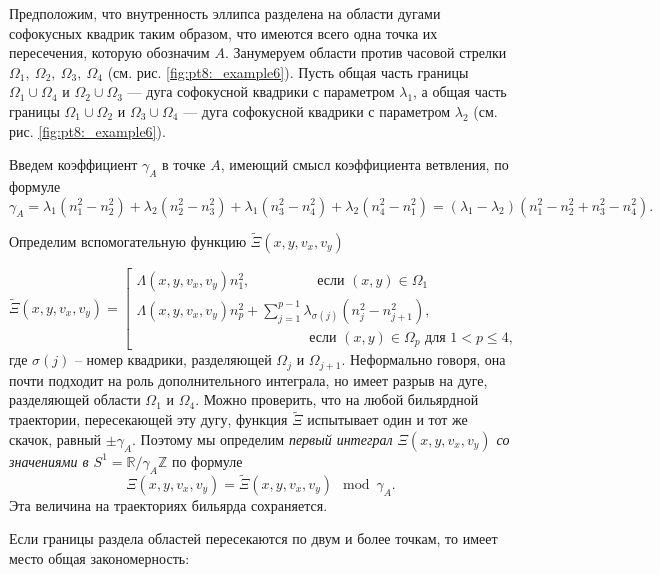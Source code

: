 Предположим, что внутренность эллипса разделена на области дугами софокусных квадрик таким образом, что имеются всего одна точка их пересечения, которую обозначим $A$.
Занумеруем области против часовой стрелки $\Omega_1, \ \Omega_2, \ \Omega_3, \ \Omega_4$ (см. рис. \ref{fig:pt8:_example6}).
Пусть общая часть границы $\Omega_1 \cup \Omega_4$ и $\Omega_2 \cup \Omega_3$ --- дуга софокусной квадрики с параметром $\lambda_1$, а общая часть границы $\Omega_1 \cup \Omega_2$ и $\Omega_3 \cup \Omega_4$ --- дуга софокусной квадрики с параметром $\lambda_2$ (см. рис. \ref{fig:pt8:_example6}).

Введем коэффициент $\gamma_A$ в точке $A$, имеющий смысл коэффициента ветвления, по формуле $$\gamma_A = \lambda_1(n_1^2 - n_2^2) + \lambda_2(n_2^2-n_3^2) + \lambda_1(n_3^2-n_4^2) + \lambda_2(n_4^2-n_1^2) = (\lambda_1 - \lambda_2) ( n_1^2 - n_2^2 + n_3^2 - n_4^2).$$

Определим вспомогательную функцию $\widetilde{\Xi}(x, y, v_x, v_y)$ 

\begin{equation*}
\widetilde{\Xi}(x, y, v_x, v_y) = \left[
\begin{array}{ll}
    \Lambda(x, y, v_x, v_y) n_1^2, \qquad  \  \ \qquad   \text{ если } (x,y) \in \Omega_1 
    \\
    \Lambda(x, y, v_x, v_y) n_p^2 + \sum_{j=1}^{p-1} \lambda_{\sigma(j)}(n_j^2-n_{j+1}^2), \\
     \qquad \qquad \qquad \qquad \qquad \qquad  \text{ если } (x,y) \in \Omega_p \text{ для } 1 < p \leq 4,
\end{array}
\right.
\end{equation*}
где $\sigma(j)$ -- номер квадрики, разделяющей $\Omega_j$ и $\Omega_{j+1}$. 
Неформально говоря, она почти подходит на роль дополнительного интеграла, но имеет разрыв на дуге, разделяющей области $\Omega_1$ и $\Omega_4$. Можно проверить, что на любой бильярдной траектории, пересекающей эту дугу, функция $\widetilde{\Xi}$ испытывает один и тот же скачок, равный  $\pm \gamma_A$. 
Поэтому мы определим \textit{первый интеграл $\Xi(x, y, v_x, v_y)$ со значениями в $S^1= \mathbb{R}/\gamma_A \mathbb{Z}$ }по формуле $$\Xi(x, y, v_x, v_y) = \widetilde{\Xi}(x, y, v_x, v_y) \mod \gamma_A.$$
Эта величина на траекториях бильярда сохраняется.
\bigskip

Если границы раздела областей пересекаются по двум и более точкам, то имеет место общая закономерность: 
\medskip

